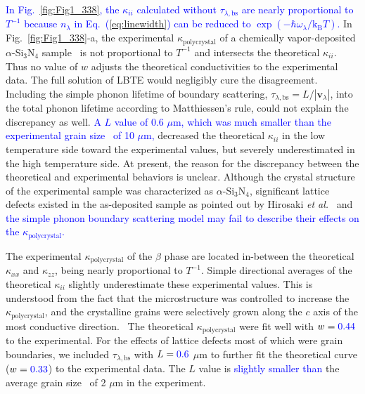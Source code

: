 \documentclass[twocolumn,amsmath,amssymb,a4paper,prb,superscriptaddress,floatfix]{revtex4-1}
\begin{document}
\textcolor {blue}{In Fig.~\ref{fig:Fig1_338}, the $\kappa_{ii}$ calculated
without $\tau_{\lambda,\text{bs}}$ are nearly proportional to $T^{-1}$ because
$n_\lambda$ in Eq.~(\ref{eq:linewidth}) can be reduced to
$\exp(-\hbar\omega_\lambda/\mathrm{k_B}T)$.} In Fig.~\ref{fig:Fig1_338}-a, the
experimental $\kappa_\mathrm{polycrystal}$ of a
chemically vapor-deposited $\alpha$-Si$_3$N$_4$ sample~\cite{hirai} is not
proportional to $T^{-1}$ and intersects the theoretical $\kappa_{ii}$.  Thus
no value of $w$ adjusts the theoretical conductivities to the experimental
data.  The full solution of LBTE would negligibly cure the disagreement.
Including the simple phonon lifetime of boundary scattering,
$\tau_{\lambda,\text{bs}}=L/|\mathbf{v}_\lambda|$, into the total phonon
lifetime according to Matthiessen's rule, could not explain the discrepancy as
well.  \textcolor {blue}{A $L$ value of 0.6 $\mu\text{m}$, which was much
smaller than the experimental grain size~\cite{hirai} of 10 $\mu\text{m}$,} decreased the
theoretical $\kappa$$_{ii}$ in the low temperature side toward
the experimental values, but severely underestimated in
the high temperature side.  At present, the reason for the discrepancy between
the theoretical and experimental behaviors is unclear.  Although the crystal
structure of the experimental sample was characterized as $\alpha$-Si$_3$N$_4$,
significant lattice defects existed in the as-deposited sample as pointed
out by Hirosaki {\it et al.}~\cite{hirosaki-md} and \textcolor{blue}{the simple
phonon boundary scattering model may fail to describe their effects on the
$\kappa_\mathrm{polycrystal}$.} 

The experimental $\kappa_\mathrm{polycrystal}$ of the $\beta$ phase are located
in-between the theoretical $\kappa$$_{xx}$ and  $\kappa$$_{zz}$, being nearly
proportional to $T^{-1}$. Simple directional averages of the theoretical
$\kappa_{ii}$ slightly underestimate these experimental values.  This is
understood from the fact that the microstructure was controlled to increase the
$\kappa_\mathrm{polycrystal}$, and the crystalline grains were selectively grown along
the $c$ axis of the most conductive direction.~\cite{hirosaki} The theoretical
$\kappa_\mathrm{polycrystal}$ were fit well with $w=\textcolor{blue}{0.44}$  to
the experimental.  For the effects of lattice
defects most of which were grain boundaries, we included
$\tau_{\lambda,\text{bs}}$ with $L = \textcolor{blue}{0.6}$ $\mu\text{m}$ to
further fit the theoretical curve ($w=\textcolor{blue}{0.33}$) to the
experimental data.  The $L$ value is \textcolor{blue}{slightly smaller than}
the average grain size~\cite{hirosaki} of 2 $\mu\text{m}$ in the experiment.
\end{document}
